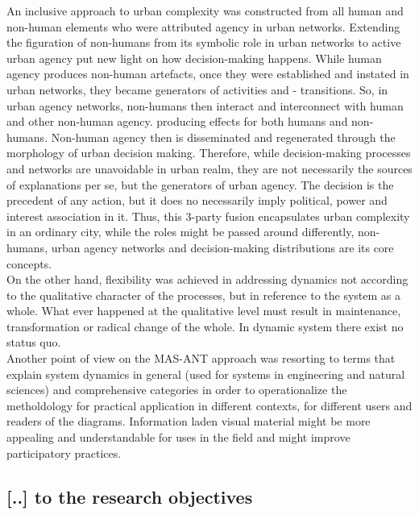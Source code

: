 \documentclass[11pt]{report}
\begin{document}
An inclusive approach to urban complexity was constructed from all human and non-human elements who were attributed agency in urban networks.
Extending the figuration of non-humans from its symbolic role in urban networks to active urban agency put new light on how decision-making happens.
While human agency produces non-human artefacts, once they were established and instated in urban networks, they became generators of activities and - transitions. 
So, in urban agency networks, non-humans then interact and interconnect with human and other non-human agency. producing effects for both humans and non-humans.
Non-human agency then is disseminated and regenerated through the morphology of urban decision making.
Therefore, while decision-making processes and networks are unavoidable in urban realm, they are not necessarily the sources of explanations per se, but the generators of urban agency. The decision is the precedent of any action, but it does no necessarily imply political, power and interest association in it. 
Thus, this 3-party fusion encapsulates urban complexity in an ordinary city, while the roles might be passed around differently, non-humans, urban agency networks and decision-making distributions are its core concepts.
\\
On the other hand, flexibility was achieved in addressing  dynamics not according to the qualitative character of the processes, but in reference to the system as a whole. What ever happened at the qualitative level must result in maintenance, transformation or radical change of the whole. In dynamic system there exist no status quo.
\\
Another point of view on the MAS-ANT approach was resorting to terms that explain system dynamics in general (used for systems in engineering and natural sciences) and comprehensive categories in order to operationalize the metholdology for practical application in different contexts, for different users and readers of the diagrams.
Information laden visual material might be more appealing and understandable for uses in the field and might improve participatory practices.

\subsection{[..] to the research objectives}
\end{document}
